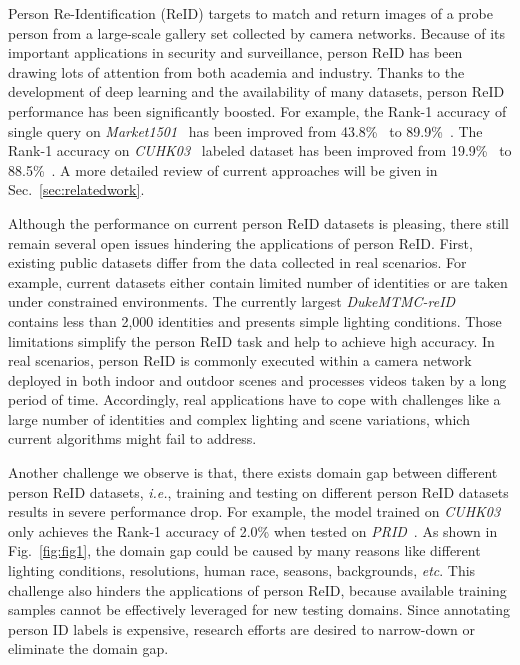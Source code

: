 \documentclass[10pt,twocolumn,letterpaper]{article}
\begin{document}
Person Re-Identification (ReID) targets to match and return images of a probe person from a large-scale gallery set collected by camera networks. Because of its important applications in security and surveillance, person ReID has been drawing lots of attention from both academia and industry. Thanks to the development of deep learning and the availability of many datasets, person ReID performance has been significantly boosted. For example, the Rank-1 accuracy of single query on \emph{Market1501}~\cite{zheng2015scalable} has been improved from 43.8\%~\cite{liao2015person} to 89.9\%~\cite{wei2017glad}. The Rank-1 accuracy on \emph{CUHK03}~\cite{li2014deepreid} labeled dataset has been improved from 19.9\%~\cite{li2014deepreid} to 88.5\%~\cite{su2017pose}. A more detailed review of current approaches will be given in Sec.~\ref{sec:relatedwork}.

Although the performance on current person ReID datasets is pleasing, there still remain several open issues hindering the applications of person ReID. First, existing public datasets differ from the data collected in real scenarios. For example, current datasets either contain limited number of identities or are taken under constrained environments. The currently largest \emph{DukeMTMC-reID}~\cite{zheng2017unlabeled} contains less than 2,000 identities and presents simple lighting conditions. Those limitations simplify the person ReID task and help to achieve high accuracy. In real scenarios, person ReID is commonly executed within a camera network deployed in both indoor and outdoor scenes and processes videos taken by a long period of time. Accordingly, real applications have to cope with challenges like a large number of identities and complex lighting and scene variations, which current algorithms might fail to address.

Another challenge we observe is that, there exists domain gap between different person ReID datasets, \emph{i.e.}, training and testing on different person ReID datasets results in severe performance drop. For example, the model trained on \emph{CUHK03}~\cite{li2014deepreid} only achieves the Rank-1 accuracy of 2.0\% when tested on \emph{PRID}~\cite{hirzer2011person}. As shown in Fig.~\ref{fig:fig1}, the domain gap could be caused by many reasons like different lighting conditions, resolutions, human race, seasons, backgrounds, \emph{etc}. This challenge also hinders the applications of person ReID, because available training samples cannot be effectively leveraged for new testing domains. Since annotating person ID labels is expensive, research efforts are desired to narrow-down or eliminate the domain gap.
\end{document}

